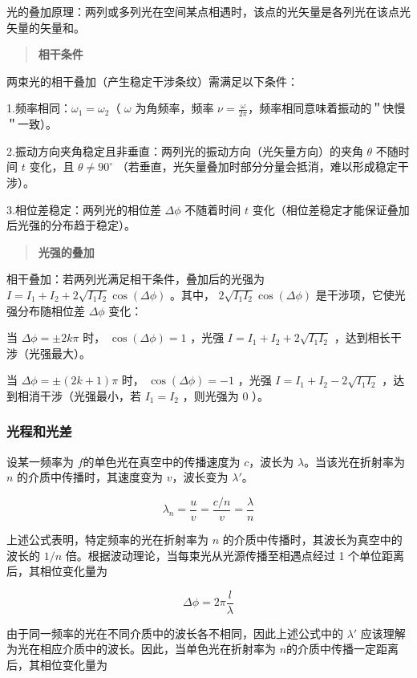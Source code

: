 \documentclass{ctexart}
\begin{document}
光的叠加原理：两列或多列光在空间某点相遇时，该点的光矢量是各列光在该点光矢量的矢量和。


\begin{quote}
    \textbf{相干条件}
\end{quote}
两束光的相干叠加（产生稳定干涉条纹）需满足以下条件：

    1.频率相同：\(\omega_{1} = \omega_{2}\)（ $\omega$ 为角频率，频率 $\nu= \frac{\omega}{2\pi}$，频率相同意味着振动的＂快慢＂一致）。

    2.振动方向夹角稳定且非垂直：两列光的振动方向（光矢量方向）的夹角 $\theta$ 不随时间 $t$ 变化，且 $\theta \neq 90^\circ$ （若垂直，光矢量叠加时部分分量会抵消，难以形成稳定干涉）。

    3.相位差稳定：两列光的相位差 $\Delta \phi$ 不随着时间 $t$ 变化（相位差稳定才能保证叠加后光强的分布趋于稳定）。

\begin{quote}
    \textbf{光强的叠加}
\end{quote}

相干叠加：若两列光满足相干条件，叠加后的光强为 $I = I_1 + I_2 + 2 \sqrt{I_1 I_2} \cos(\Delta \phi)$ 。其中， $2 \sqrt{I_1 I_2} \cos(\Delta \phi)$ 是干涉项，它使光强分布随相位差 $\Delta \phi$ 变化：

当 $\Delta \phi = \pm 2k\pi$ 时， $\cos(\Delta \phi) = 1$ ，光强 $I = I_1 + I_2 + 2 \sqrt{I_1 I_2}$ ，达到相长干涉（光强最大）。

当 $\Delta \phi = \pm (2k+1)\pi$ 时， $\cos(\Delta \phi) = -1$ ，光强 $I = I_1 + I_2 - 2 \sqrt{I_1 I_2}$ ，达到相消干涉（光强最小，若 $I_1 = I_2$ ，则光强为 $0$ ）。

\subsubsection{光程和光差}
设某一频率为 $f$的单色光在真空中的传播速度为 $c$，波长为 $\lambda$。当该光在折射率为 $n$ 的介质中传播时，其速度变为 $v$，波长变为 $\lambda'$。

\[\lambda_{n} = \frac{u}{v} = \frac{c/n}{v} = \frac{\lambda}{n}\]

上述公式表明，特定频率的光在折射率为 $n$ 的介质中传播时，其波长为真空中的波长的 $1/n$ 倍。根据波动理论，当每束光从光源传播至相遇点经过 1 个单位距离后，其相位变化量为


\[\Delta\phi = 2\pi\frac{l}{\lambda}\]

由于同一频率的光在不同介质中的波长各不相同，因此上述公式中的 $\lambda'$ 应该理解为光在相应介质中的波长。因此，当单色光在折射率为 $n$的介质中传播一定距离后，其相位变化量为
\end{document}
